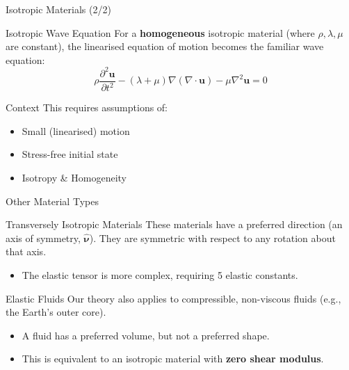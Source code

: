 \documentclass{beamer}
\begin{document}
\begin{frame}{Isotropic Materials (2/2)}
    \begin{alertblock}{Isotropic Wave Equation}
        For a \textbf{homogeneous} isotropic material (where $\rho, \lambda, \mu$ are constant), the linearised equation of motion becomes the familiar wave equation:
        $$ \rho\frac{\partial^2 \mathbf{u}}{\partial t^2} - (\lambda + \mu)\nabla(\nabla\cdot \mathbf{u}) - \mu\nabla^2 \mathbf{u} = 0 $$
    \end{alertblock}
    \pause
    \begin{exampleblock}{Context}
        This requires assumptions of:
        \begin{itemize}
            \item Small (linearised) motion
            \item Stress-free initial state
            \item Isotropy \& Homogeneity
        \end{itemize}
    \end{exampleblock}
\end{frame}

\begin{frame}{Other Material Types}
    \begin{block}{Transversely Isotropic Materials}
        These materials have a preferred direction (an axis of symmetry, $\hat{\boldsymbol{\nu}}$). They are symmetric with respect to any rotation about that axis.
        \begin{itemize}
            \item The elastic tensor is more complex, requiring 5 elastic constants.
        \end{itemize}
    \end{block}
    \pause
    \begin{block}{Elastic Fluids}
        Our theory also applies to compressible, non-viscous fluids (e.g., the Earth's outer core).
        \begin{itemize}
            \item A fluid has a preferred volume, but not a preferred shape.
            \item This is equivalent to an isotropic material with \textbf{zero shear modulus}.
        \end{itemize}
    \end{block}
\end{frame}

\end{document}
